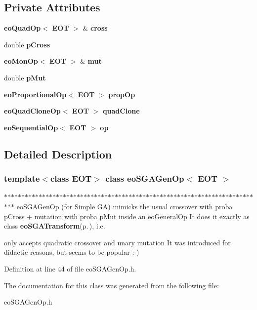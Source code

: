 \subsection*{Private Attributes}
\begin{CompactItemize}
\item 
{\bf eo\-Quad\-Op}$<$ {\bf EOT} $>$ \& {\bf cross}\label{classeo_s_g_a_gen_op_r0}

\item 
double {\bf p\-Cross}\label{classeo_s_g_a_gen_op_r1}

\item 
{\bf eo\-Mon\-Op}$<$ {\bf EOT} $>$ \& {\bf mut}\label{classeo_s_g_a_gen_op_r2}

\item 
double {\bf p\-Mut}\label{classeo_s_g_a_gen_op_r3}

\item 
{\bf eo\-Proportional\-Op}$<$ {\bf EOT} $>$ {\bf prop\-Op}\label{classeo_s_g_a_gen_op_r4}

\item 
{\bf eo\-Quad\-Clone\-Op}$<$ {\bf EOT} $>$ {\bf quad\-Clone}\label{classeo_s_g_a_gen_op_r5}

\item 
{\bf eo\-Sequential\-Op}$<$ {\bf EOT} $>$ {\bf op}\label{classeo_s_g_a_gen_op_r6}

\end{CompactItemize}


\subsection{Detailed Description}
\subsubsection*{template$<$class EOT$>$ class eo\-SGAGen\-Op$<$ EOT $>$}

$\ast$$\ast$$\ast$$\ast$$\ast$$\ast$$\ast$$\ast$$\ast$$\ast$$\ast$$\ast$$\ast$$\ast$$\ast$$\ast$$\ast$$\ast$$\ast$$\ast$$\ast$$\ast$$\ast$$\ast$$\ast$$\ast$$\ast$$\ast$$\ast$$\ast$$\ast$$\ast$$\ast$$\ast$$\ast$$\ast$$\ast$$\ast$$\ast$$\ast$$\ast$$\ast$$\ast$$\ast$$\ast$$\ast$$\ast$$\ast$$\ast$$\ast$$\ast$$\ast$$\ast$$\ast$$\ast$$\ast$$\ast$$\ast$$\ast$$\ast$$\ast$$\ast$$\ast$$\ast$$\ast$$\ast$$\ast$$\ast$$\ast$$\ast$$\ast$$\ast$$\ast$$\ast$$\ast$ eo\-SGAGen\-Op (for Simple GA) mimicks the usual crossover with proba p\-Cross + mutation with proba p\-Mut inside an eo\-General\-Op It does it exactly as class {\bf eo\-SGATransform}{\rm (p.\,\pageref{classeo_s_g_a_transform})}, i.e. 

only accepts quadratic crossover and unary mutation It was introduced for didactic reasons, but seems to be popular :-) 



Definition at line 44 of file eo\-SGAGen\-Op.h.

The documentation for this class was generated from the following file:\begin{CompactItemize}
\item 
eo\-SGAGen\-Op.h\end{CompactItemize}
